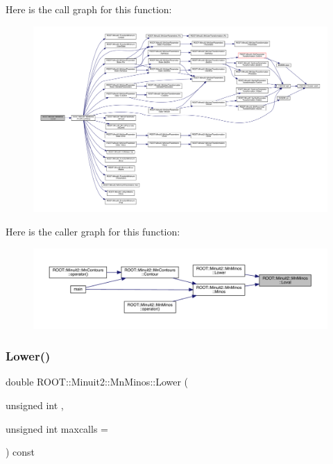 Here is the call graph for this function\+:
\nopagebreak
\begin{figure}[H]
\begin{center}
\leavevmode
\includegraphics[width=350pt]{dc/d91/classROOT_1_1Minuit2_1_1MnMinos_a708381f90e4bd9118dec60726a1bdf73_cgraph}
\end{center}
\end{figure}
Here is the caller graph for this function\+:
\nopagebreak
\begin{figure}[H]
\begin{center}
\leavevmode
\includegraphics[width=350pt]{dc/d91/classROOT_1_1Minuit2_1_1MnMinos_a708381f90e4bd9118dec60726a1bdf73_icgraph}
\end{center}
\end{figure}
\mbox{\label{classROOT_1_1Minuit2_1_1MnMinos_a0e6c6ab67bdd7b3461d900f64b4908ba}} 
\subsubsection{\texorpdfstring{Lower()}{Lower()}\hspace{0.1cm}{\footnotesize\ttfamily [1/3]}}
{\footnotesize\ttfamily double R\+O\+O\+T\+::\+Minuit2\+::\+Mn\+Minos\+::\+Lower (\begin{DoxyParamCaption}\item[{unsigned int}]{,  }\item[{unsigned int}]{maxcalls = {} }\end{DoxyParamCaption}) const}



